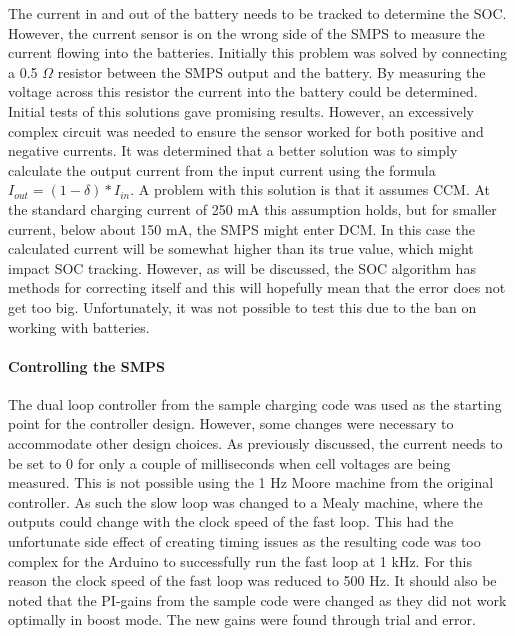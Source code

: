 \documentclass[a4paper]{article}
\begin{document}
The current in and out of the battery needs to be tracked to determine 
the SOC. However, the current sensor is on the wrong side of the SMPS 
to measure the current flowing into the batteries. Initially this 
problem was solved by connecting a 0.5 $\Omega$ resistor between the 
SMPS output and the battery. By measuring the voltage across this 
resistor the current into the battery could be determined. Initial 
tests of this solutions gave promising results. However, an excessively 
complex circuit was needed to ensure the sensor worked for both positive 
and negative currents. It was determined that a better solution was to 
simply calculate the output current from the input current using the 
formula \( I_{out} = (1 - \delta)*I_{in} \). A problem with this solution 
is that it assumes CCM. At the standard charging current of 250 mA this 
assumption holds, but for smaller current, below about 150 mA, the SMPS 
might enter DCM. In this case the calculated current will be somewhat 
higher than its true value, which might impact SOC tracking. However, 
as will be discussed, the SOC algorithm has methods for correcting 
itself and this will hopefully mean that the error does not get too 
big. Unfortunately, it was not possible to test this due to the ban 
on working with batteries.  

\paragraph*{Controlling the SMPS}
\vspace{-6pt}
The dual loop controller from the sample charging code\cite{chargeCode} was 
used as the starting point for the controller design. However, some 
changes were necessary to accommodate other design choices. As previously 
discussed, the current needs to be set to 0 for only a couple of 
milliseconds when cell voltages are being measured. This is not 
possible using the 1 Hz Moore machine from the original controller. 
As such the slow loop was changed to a Mealy machine, where the 
outputs could change with the clock speed of the fast loop. This had the 
unfortunate side effect of creating timing issues as the resulting 
code was too complex for the Arduino to successfully run the fast 
loop at 1 kHz. For this reason the clock speed of the fast loop was 
reduced to 500 Hz. It should also be noted that the PI-gains from 
the sample code were changed as they did not work optimally in boost 
mode. The new gains were found through trial and error.
\end{document}
